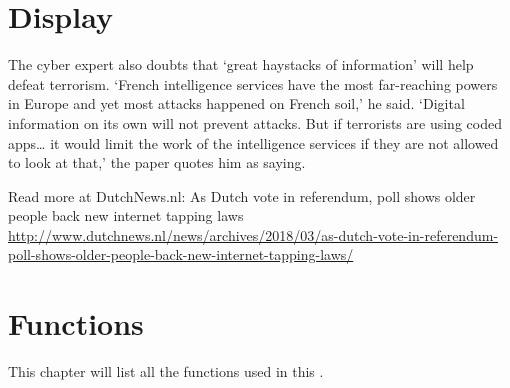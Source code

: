 \documentclass[]{book}
\begin{document}
\chapter{Display}\label{display}

The cyber expert also doubts that `great haystacks of information' will
help defeat terrorism. `French intelligence services have the most
far-reaching powers in Europe and yet most attacks happened on French
soil,' he said. `Digital information on its own will not prevent
attacks. But if terrorists are using coded apps\ldots{} it would limit
the work of the intelligence services if they are not allowed to look at
that,' the paper quotes him as saying.

Read more at DutchNews.nl: As Dutch vote in referendum, poll shows older
people back new internet tapping laws
\url{http://www.dutchnews.nl/news/archives/2018/03/as-dutch-vote-in-referendum-poll-shows-older-people-back-new-internet-tapping-laws/}

\chapter{Functions}\label{functions}

This chapter will list all the functions used in this .

\printindex
\end{document}
